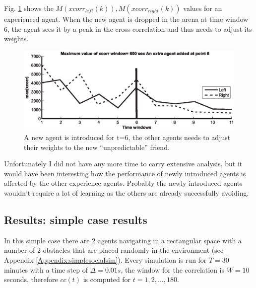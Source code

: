 Fig. \ref{info:agentadd} shows the $M(xcorr_{left}(k)),M(xcorr_{right}(k))$ values
for an experienced agent.
When the new agent is dropped in the arena at time window 6, the agent sees it
by a peak in the cross correlation and thus needs to adjust its weights.  
\begin{figure}[htbp]
  \begin{center}
    \includegraphics[scale=0.65]{figures/infomeasure/agentvariation.eps}
    \caption[Max correlation variation analysis]{A new agent is introduced
	    for t=6, the other agents needs to adjust their weights to the new
	    ``unpredictable'' friend.\label{info:agentadd}}
  \end{center}
\end{figure}
Unfortunately I did not have any more time to carry extensive analysis, but 
it would have been interesting how the performance of newly introduced agents is affected
by the other experience agents.
Probably the newly introduced agents wouldn't require a lot of learning as the
others are already successfully avoiding.

\subsection{Results: simple case results}
In this simple case there are 2 agents navigating in a rectangular space with
a number of 2 obstacles that are placed randomly in the environment (see Appendix \ref{Appendix:simplesocialsim}). 
Every simulation is run for $T=30$ minutes with a time step of $\varDelta=0.01s$,
the window for the correlation is $W=10$ seconds, therefore $cc(t)$ is computed
for $t=1,2,...,180$.

